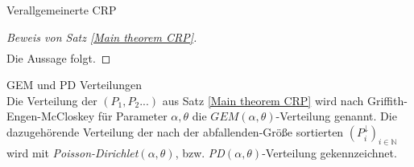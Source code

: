 \begin{section}{Verallgemeinerte CRP}
\begin{proof}[Beweis von Satz \ref{Main theorem CRP}]
\begin{align*}
    \end{align*}
Die Aussage folgt.
\end{proof}
\begin{Definition}\textnormal{GEM und PD Verteilungen} \label{GEM und PD Verteilungen}\\
Die Verteilung der $(P_1,P_2...)$ aus Satz \ref{Main theorem CRP} wird nach Griffith-Engen-McCloskey für Parameter $\alpha,\theta$ die $GEM(\alpha,\theta)$-Verteilung genannt. Die dazugehörende Verteilung der nach der abfallenden-Größe sortierten $(P^{\downarrow}_i)_{i \in \mathbb{N}}$ wird mit \textit{Poisson-Dirichlet}$(\alpha,\theta)$, bzw. \textit{PD}$(\alpha,\theta)$-Verteilung gekennzeichnet. 
\end{Definition}
\end{section}